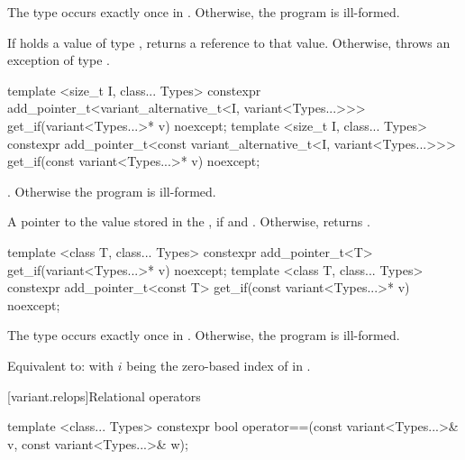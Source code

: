 \begin{itemdescr}
\pnum
\requires
The type  occurs exactly once in .
Otherwise, the program is ill-formed.

\pnum
\effects
If  holds a value of type , returns a reference to that value.
Otherwise, throws an exception of type .
\end{itemdescr}

%
%
\begin{itemdecl}
template <size_t I, class... Types>
  constexpr add_pointer_t<variant_alternative_t<I, variant<Types...>>>
    get_if(variant<Types...>* v) noexcept;
template <size_t I, class... Types>
  constexpr add_pointer_t<const variant_alternative_t<I, variant<Types...>>>
    get_if(const variant<Types...>* v) noexcept;
\end{itemdecl}

\begin{itemdescr}
\pnum
\requires
{}.
Otherwise the program is ill-formed.

\pnum
\returns
A pointer to the value stored in the , if 
and . Otherwise, returns .
\end{itemdescr}

%
%
\begin{itemdecl}
template <class T, class... Types>
  constexpr add_pointer_t<T>
    get_if(variant<Types...>* v) noexcept;
template <class T, class... Types>
  constexpr add_pointer_t<const T>
    get_if(const variant<Types...>* v) noexcept;
\end{itemdecl}

\begin{itemdescr}
\pnum
\requires
The type  occurs exactly once in .
Otherwise, the program is ill-formed.

\pnum
\effects
Equivalent to:  with $i$ being the zero-based
index of  in .
\end{itemdescr}

[variant.relops]{Relational operators}

%
\begin{itemdecl}
template <class... Types>
  constexpr bool operator==(const variant<Types...>& v, const variant<Types...>& w);
\end{itemdecl}

